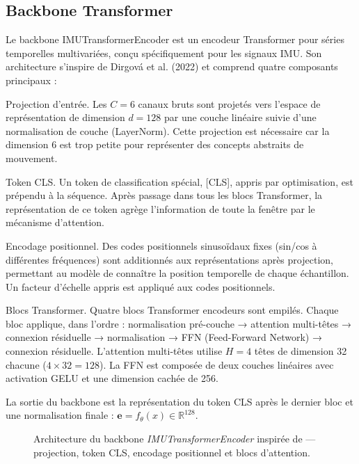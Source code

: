 \subsection{Backbone Transformer}

Le backbone IMUTransformerEncoder est un encodeur Transformer pour séries temporelles multivariées, conçu spécifiquement pour les signaux IMU. Son architecture s'inspire de Dirgová et al. (2022) et comprend quatre composants principaux :

Projection d'entrée. Les $C = 6$ canaux bruts sont projetés vers l'espace de représentation de dimension $d = 128$ par une couche linéaire suivie d'une normalisation de couche (LayerNorm). Cette projection est nécessaire car la dimension 6 est trop petite pour représenter des concepts abstraits de mouvement.

Token CLS. Un token de classification spécial, [CLS], appris par optimisation, est prépendu à la séquence. Après passage dans tous les blocs Transformer, la représentation de ce token agrège l'information de toute la fenêtre par le mécanisme d'attention.

Encodage positionnel. Des codes positionnels sinusoïdaux fixes (sin/cos à différentes fréquences) sont additionnés aux représentations après projection, permettant au modèle de connaître la position temporelle de chaque échantillon. Un facteur d'échelle appris est appliqué aux codes positionnels.

Blocs Transformer. Quatre blocs Transformer encodeurs sont empilés. Chaque bloc applique, dans l'ordre : normalisation pré-couche → attention multi-têtes → connexion résiduelle → normalisation → FFN (Feed-Forward Network) → connexion résiduelle. L'attention multi-têtes utilise $H = 4$ têtes de dimension 32 chacune ($4 \times 32 = 128$). La FFN est composée de deux couches linéaires avec activation GELU et une dimension cachée de 256.

La sortie du backbone est la représentation du token CLS après le dernier bloc et une normalisation finale : $\mathbf{e} = f_\theta(x) \in \mathbb{R}^{128}$.

\begin{figure}[H]
  \centering
  \caption[Architecture du backbone Transformer]{Architecture du backbone \emph{IMUTransformerEncoder}
  inspirée de \parencite{dirgova2022} — projection, token CLS, encodage positionnel et blocs d'attention.}
  \label{fig:backbone_transformer}
\end{figure}

